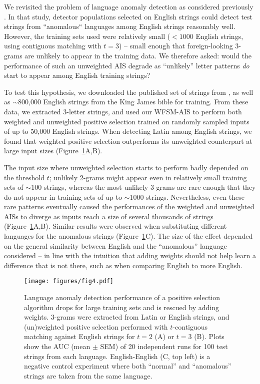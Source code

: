 \documentclass{llncs}
\begin{document}
We revisited the problem of language anomaly detection as 
considered previously \cite{Wortel2020t}. In that study, detector populations 
selected on English strings could detect test strings from ``anomalous`` 
languages among English strings reasonably well. However, the training sets used were relatively 
small ($< 1000$ English strings, using contiguous matching with $t=3$) -- small enough 
that foreign-looking 3-grams are unlikely to appear in the training data. We therefore 
asked: would the performance 
of such an unweighted AIS degrade as ``unlikely'' letter patterns \emph{do} start to appear
among English training strings?

To test this hypothesis, we downloaded the published set of strings from \cite{Wortel2020t}, 
as well as $\sim$800,000 English strings from the King James bible for training.
From these data, we extracted 3-letter strings, and used our WFSM-AIS to perform both weighted 
and unweighted positive selection trained on randomly sampled inputs of up to 50,000 English 
 strings. When detecting Latin among English strings, we found that weighted 
positive selection outperforms %
its unweighted counterpart at large input sizes (Figure~\ref{figurelang}A,B). 

The input size where unweighted selection starts to perform badly depended on the 
threshold $t$; unlikely 2-grams might appear even in 
relatively small training sets of $\sim$100 strings, whereas the most unlikely 3-grams 
are rare enough that they do not appear in training sets of up to $\sim$1000 strings.
Nevertheless, even these rare patterns eventually caused the performances of the 
weighted and unweighted AISs to 
diverge as inputs reach a size of several thousands of strings (Figure~\ref{figurelang}A,B). 
Similar results were observed when substituting different languages for the 
anomalous strings (Figure~\ref{figurelang}C). The size of the effect depended on the 
general similarity between English and the ``anomalous'' language considered -- in line
with the intuition that adding weights should not help learn a difference that is not 
there, such as when comparing English to more English. %

\begin{figure}[t]
  \centering
   \texttt{[image: figures/fig4.pdf]}
   \caption{ 
   Language anomaly detection performance of a positive selection algorithm drops for 
   large training sets and is rescued by adding weights. 3-grams were extracted from 
   Latin or English strings, and (un)weighted positive selection performed  with 
   $t$-contiguous matching against English strings for  $t=2$ (A) or $t=3$ (B). 
   Plots show the AUC (mean $\pm$ SEM) of 20 independent runs for 100 test strings 
   from each language. 	English-English (C, top left) is a negative control experiment 
	where both ``normal'' and ``anomalous''
	strings are taken from the same language.
  }
  \label{figurelang}
\end{figure}
\end{document}
